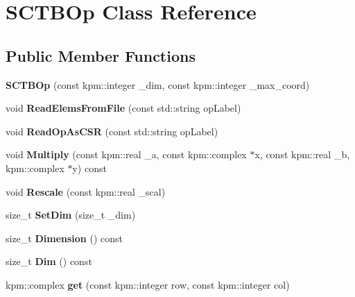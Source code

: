 \hypertarget{classSCTBOp}{}\section{S\+C\+T\+B\+Op Class Reference}
\label{classSCTBOp}
\subsection*{Public Member Functions}
\begin{DoxyCompactItemize}
\item 
{\bfseries S\+C\+T\+B\+Op} (const kpm\+::integer \+\_\+dim, const kpm\+::integer \+\_\+max\+\_\+coord)\hypertarget{classSCTBOp_a2f49dceb3110b705a5c6b5e15ff5e381}{}\label{classSCTBOp_a2f49dceb3110b705a5c6b5e15ff5e381}

\item 
void {\bfseries Read\+Elems\+From\+File} (const std\+::string op\+Label)\hypertarget{classSCTBOp_ae4cdea75c3ba578a837e82f755b20fc3}{}\label{classSCTBOp_ae4cdea75c3ba578a837e82f755b20fc3}

\item 
void {\bfseries Read\+Op\+As\+C\+SR} (const std\+::string op\+Label)\hypertarget{classSCTBOp_aff232f7366fbd3c2169d6187f2bcf7b7}{}\label{classSCTBOp_aff232f7366fbd3c2169d6187f2bcf7b7}

\item 
void {\bfseries Multiply} (const kpm\+::real \+\_\+a, const kpm\+::complex $\ast$x, const kpm\+::real \+\_\+b, kpm\+::complex $\ast$y) const \hypertarget{classSCTBOp_a46bf2dbc8ac24fa7f4e93df9934b3695}{}\label{classSCTBOp_a46bf2dbc8ac24fa7f4e93df9934b3695}

\item 
void {\bfseries Rescale} (const kpm\+::real \+\_\+scal)\hypertarget{classSCTBOp_a91355eb484ada639172fe69c64a2c6ab}{}\label{classSCTBOp_a91355eb484ada639172fe69c64a2c6ab}

\item 
size\+\_\+t {\bfseries Set\+Dim} (size\+\_\+t \+\_\+dim)\hypertarget{classSCTBOp_aae6238f1f76677fef7315f92517bab4d}{}\label{classSCTBOp_aae6238f1f76677fef7315f92517bab4d}

\item 
size\+\_\+t {\bfseries Dimension} () const \hypertarget{classSCTBOp_aea3b4e4968e27094f83d411fde98672a}{}\label{classSCTBOp_aea3b4e4968e27094f83d411fde98672a}

\item 
size\+\_\+t {\bfseries Dim} () const \hypertarget{classSCTBOp_af8a32dcd49337e8f75b66f0dca0c6ba2}{}\label{classSCTBOp_af8a32dcd49337e8f75b66f0dca0c6ba2}

\item 
kpm\+::complex {\bfseries get} (const kpm\+::integer row, const kpm\+::integer col)\hypertarget{classSCTBOp_a9d0059c1a158dc23075e5fc1c9cb5ef1}{}\label{classSCTBOp_a9d0059c1a158dc23075e5fc1c9cb5ef1}

\end{DoxyCompactItemize}
